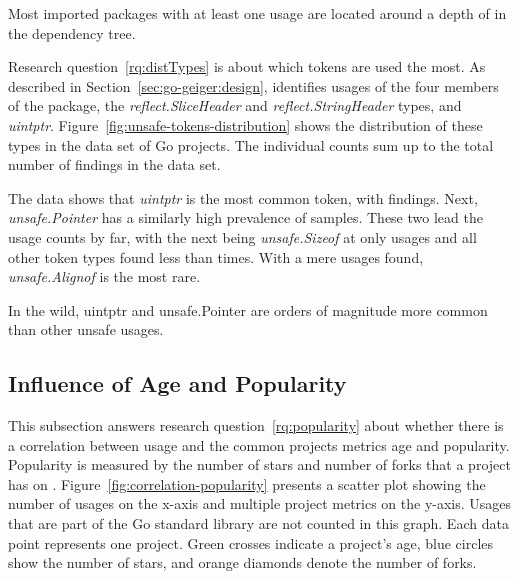 \begin{tcolorbox}[boxsep=3pt, enlarge top by=5pt, title=Answer to~\ref{rq:depsDepth}]
    Most imported packages with at least one \unsafe{} usage are located around a depth of
    \averageUnsafeImportDepthRounded{} in the dependency tree.
\end{tcolorbox}

Research question~\ref{rq:distTypes} is about which \unsafe{} tokens are used the most.
As described in Section~\ref{sec:go-geiger:design}, \toolGeiger{} identifies usages of the four members of the \unsafe{}
package, the \textit{reflect.SliceHeader} and \textit{reflect.StringHeader} types, and \textit{uintptr}.
Figure~\ref{fig:unsafe-tokens-distribution} shows the distribution of these \unsafe{} types in the data set of Go
projects.
The individual counts sum up to the total number of \uniqueUnsafeFindings{} \unsafe{} findings in the data set.



The data shows that \textit{uintptr} is the most common \unsafe{} token, with  findings.
Next, \textit{unsafe.Pointer} has a similarly high prevalence of  samples.
These two lead the usage counts by far, with the next being \textit{unsafe.Sizeof} at only  usages and
all other token types found less than  times.
With a mere  usages found, \textit{unsafe.Alignof} is the most rare.

\begin{tcolorbox}[boxsep=3pt, enlarge top by=5pt, title=Answer to~\ref{rq:distTypes}]
    In the wild, uintptr and unsafe.Pointer are orders of magnitude more common than other unsafe usages.
\end{tcolorbox}



\subsection{Influence of Age and Popularity}\label{subsec:go-geiger:evaluation:popularity}

This subsection answers research question~\ref{rq:popularity} about whether there is a correlation between \unsafe{}
usage and the common projects metrics age and popularity.
Popularity is measured by the number of stars and number of forks that a project has on \github{}.
Figure~\ref{fig:correlation-popularity} presents a scatter plot showing the number of \unsafe{} usages on the x-axis and
multiple project metrics on the y-axis.
Usages that are part of the Go standard library are not counted in this graph.
Each data point represents one project.
Green crosses indicate a project's age, blue circles show the number of stars, and orange diamonds denote the number of
forks.


